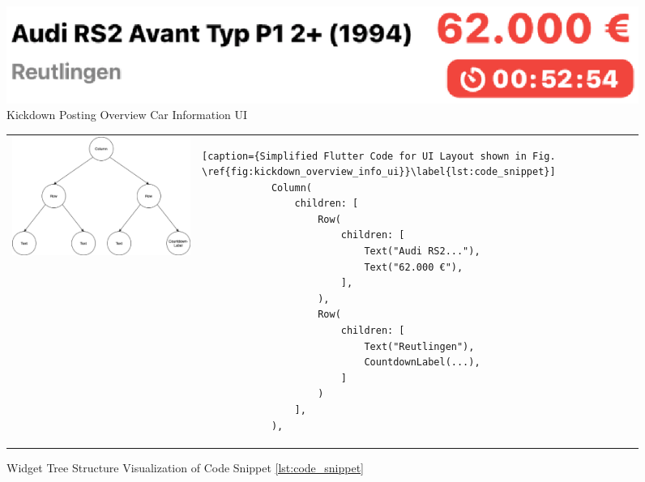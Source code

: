 \begin{figure}
    \centering
    \includegraphics[width=.5\linewidth]{images/posting_information_UI.eps}
    \caption{Kickdown Posting Overview Car Information UI}
    \label{fig:kickdown_overview_info_ui}
\end{figure}

\begin{figure}[htbp]
    \begin{tabular}{p{}p{}}
        \begin{minipage}{.4\textwidth}
        \centering
        \includegraphics[width=\linewidth]{images/Kickdown_overview_info_ui_tree.eps}
        \caption{Widget Tree Structure Visualization of Code Snippet \ref{lst:code_snippet}}
        \label{fig:kickdown_overview_info_ui_tree}
        \end{minipage}
        &
        \begin{minipage}{.6\textwidth}
            \begin{lstlisting}[caption={Simplified Flutter Code for UI Layout shown in Fig. \ref{fig:kickdown_overview_info_ui}}\label{lst:code_snippet}]
            Column(
                children: [
                    Row(
                        children: [
                            Text("Audi RS2..."),
                            Text("62.000 €"),
                        ],
                    ),
                    Row(
                        children: [
                            Text("Reutlingen"),
                            CountdownLabel(...),
                        ]
                    )
                ],
            ),
            \end{lstlisting}
        \end{minipage}
    \end{tabular}
\end{figure}

